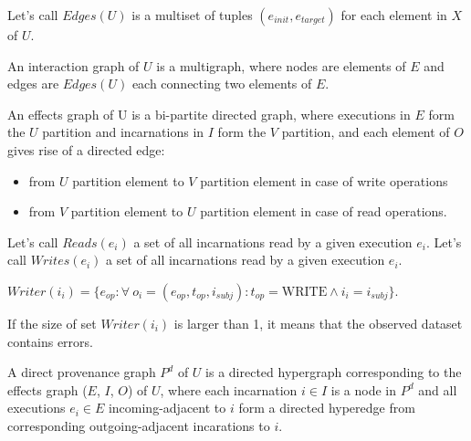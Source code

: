 Let’s call $Edges(U)$ is a multiset of tuples $(e_{init}, e_{target})$ for each element in $X$ of $U$.

\begin{definition}
An interaction graph of $U$ is a multigraph, where nodes are elements of $E$ and edges are $Edges(U)$ each connecting two elements of $E$.
\end{definition}

\begin{definition}\label{def:effects-graph}
An effects graph of U is a bi-partite directed graph, where executions in $E$ form the $U$ partition and incarnations in $I$ form the $V$ partition, and each element of $O$ gives rise of a directed edge:
\begin{itemize}
	\item from $U$ partition element to $V$ partition element in case of write operations
	\item from $V$ partition element to $U$ partition element in case of read operations.
\end{itemize}
\end{definition}

Let’s call $Reads(e_{i})$ a set of all incarnations read by a given execution $e_{i}$. Let’s call $Writes(e_{i})$ a set of all incarnations read by a given execution $e_{i}$.



$Writer(i_{i}) = \{ e_{op} : \forall\ o_{i} = (e_{op}, t_{op}, i_{subj}): t_{op} = \text{WRITE} \land i_{i} = i_{subj} \} $.

If the size of set $Writer(i_i)$ is larger than 1, it means that the observed dataset contains errors.



\begin{definition}
A direct provenance graph $P^{d}$ of $U$ is a directed hypergraph corresponding to the effects graph ($E$, $I$, $O$) of $U$, where each incarnation $i \in I$ is a node in $P^d$ and all executions $e_{i} \in E$ incoming-adjacent to $i$ form a directed hyperedge from corresponding outgoing-adjacent incarations to $i$.
\end{definition}

